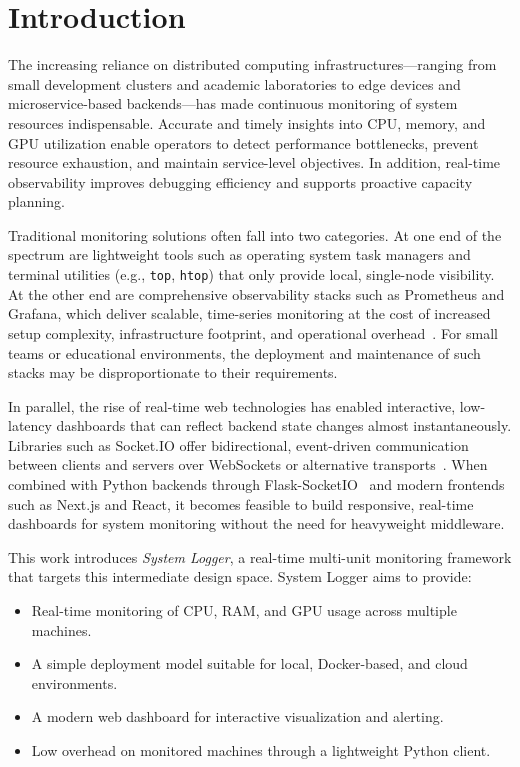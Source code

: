\documentclass[conference]{IEEEtran}
\begin{document}
\section{Introduction}

The increasing reliance on distributed computing infrastructures---ranging from small development clusters and academic laboratories to edge devices and microservice-based backends---has made continuous monitoring of system resources indispensable. Accurate and timely insights into CPU, memory, and GPU utilization enable operators to detect performance bottlenecks, prevent resource exhaustion, and maintain service-level objectives. In addition, real-time observability improves debugging efficiency and supports proactive capacity planning.

Traditional monitoring solutions often fall into two categories. At one end of the spectrum are lightweight tools such as operating system task managers and terminal utilities (e.g., \texttt{top}, \texttt{htop}) that only provide local, single-node visibility. At the other end are comprehensive observability stacks such as Prometheus and Grafana, which deliver scalable, time-series monitoring at the cost of increased setup complexity, infrastructure footprint, and operational overhead~\cite{irjetPromGraf,observabilityOS,janiUnified}. For small teams or educational environments, the deployment and maintenance of such stacks may be disproportionate to their requirements.

In parallel, the rise of real-time web technologies has enabled interactive, low-latency dashboards that can reflect backend state changes almost instantaneously. Libraries such as Socket.IO offer bidirectional, event-driven communication between clients and servers over WebSockets or alternative transports~\cite{demirSocketIO,socketioDocs}. When combined with Python backends through Flask-SocketIO~\cite{flaskSocketIO} and modern frontends such as Next.js and React, it becomes feasible to build responsive, real-time dashboards for system monitoring without the need for heavyweight middleware.

This work introduces \emph{System Logger}, a real-time multi-unit monitoring framework that targets this intermediate design space. System Logger aims to provide:
\begin{itemize}
  \item Real-time monitoring of CPU, RAM, and GPU usage across multiple machines.
  \item A simple deployment model suitable for local, Docker-based, and cloud environments.
  \item A modern web dashboard for interactive visualization and alerting.
  \item Low overhead on monitored machines through a lightweight Python client.
\end{itemize}
\end{document}

